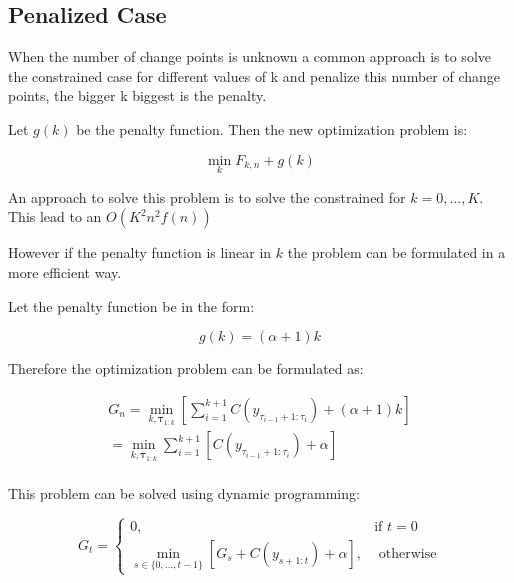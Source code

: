 \subsection{Penalized Case}

When the number of change points is unknown a common approach is to solve the constrained case for different values of k and penalize this number of change points, the bigger k biggest is the penalty.

Let $g(k)$ be the penalty function. Then the new optimization problem is:

\begin{equation}
    \min_{k} F_{k, n} + g(k)
\end{equation}

An approach to solve this problem is to solve the constrained for $k = 0, ..., K$. This lead to an $O(K^{2} n^{2} f(n))$

However if the penalty function is linear in $k$ the problem can be formulated in a more efficient way.

Let the penalty function be in the form:

\begin{equation}
    g(k) = (\alpha + 1) k
\end{equation}

Therefore the optimization problem can be formulated as:

\begin{equation}
    \begin{aligned}
        G_{n} = \min_{k, \boldsymbol \tau_{1 : k}} \left[ \sum \limits_{i = 1}^{k + 1} C(y_{\tau_{i - 1} + 1 : \tau_{i}}) + (\alpha + 1) k \right] \\
        = \min_{k, \boldsymbol \tau_{1 : k}} \sum \limits_{i = 1}^{k + 1} \left[ C(y_{\tau_{i - 1} + 1 : \tau_{i}}) + \alpha \right] \\
    \end{aligned}
\end{equation}

This problem can be solved using dynamic programming:

\begin{equation}
    G_{t} = 
    \begin{cases}
        0, & \text{if } t = 0 \\
        \displaystyle \min_{s \in \{0, ..., t - 1\}} \left[ G_{s} + C(y_{s + 1 : t}) + \alpha \right], & \text{ otherwise}
    \end{cases}
\end{equation}

